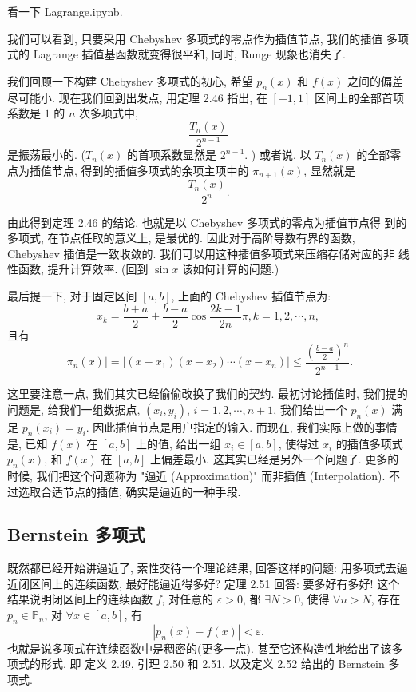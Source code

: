 \documentclass[a4paper]{ctexart}
\begin{document}
看一下 Lagrange.ipynb.

我们可以看到, 只要采用 Chebyshev 多项式的零点作为插值节点, 我们的插值
多项式的 Lagrange 插值基函数就变得很平和, 同时, Runge 现象也消失了.

我们回顾一下构建 Chebyshev 多项式的初心, 希望 $p_n(x)$ 和 $f(x)$ 之间的偏差尽可能小. 
现在我们回到出发点, 用定理 2.46 指出, 在 $[-1, 1]$ 区间上的全部首项系数是 $1$ 的 $n$ 次多项式中,
$$
\frac{T_n(x)}{2^{n - 1}}
$$
是振荡最小的. ($T_n(x)$ 的首项系数显然是 $2^{n - 1}$. )
或者说, 以 $T_n(x)$ 的全部零点为插值节点, 得到的插值多项式的余项主项中的
$\pi_{n + 1}(x)$, 显然就是
$$
\frac{T_n(x)}{2^n}.
$$

由此得到定理 2.46 的结论, 也就是以 Chebyshev 多项式的零点为插值节点得
到的多项式, 在节点任取的意义上, 是最优的. 因此对于高阶导数有界的函数,
Chebyshev 插值是一致收敛的. 我们可以用这种插值多项式来压缩存储对应的非
线性函数, 提升计算效率. (回到 $\sin x$ 该如何计算的问题.)

最后提一下, 对于固定区间 $[a, b]$, 上面的 Chebyshev 插值节点为:
$$
x_k = \frac{b + a}{2} + \frac{b - a}{2} \cos\frac{2k - 1}{2n} \pi, k = 1, 2, \cdots, n,
$$
且有
$$
|\pi_{n}(x)| = |(x - x_1) (x - x_2) \cdots (x - x_n)| \leq
\frac{\left(\frac{b - a}{2}\right)^n}{2^{n - 1}}.
$$

这里要注意一点, 我们其实已经偷偷改换了我们的契约. 最初讨论插值时, 
我们提的问题是, 给我们一组数据点, $(x_i, y_i)$, $i = 1, 2, \cdots, n + 1$, 
我们给出一个 $p_n(x)$ 满足 $p_n(x_i) = y_i$. 因此插值节点是用户指定的输入. 
而现在, 我们实际上做的事情是, 已知 $f(x)$ 在 $[a, b]$ 上的值, 
给出一组 $x_i \in [a, b]$, 使得过 $x_i$ 的插值多项式 $p_n(x)$, 
和 $f(x)$ 在 $[a, b]$ 上偏差最小. 这其实已经是另外一个问题了. 
更多的时候, 我们把这个问题称为 "逼近 (Approximation)" 而非插值 (Interpolation).
不过选取合适节点的插值, 确实是逼近的一种手段. 

\subsection{Bernstein 多项式}

既然都已经开始讲逼近了, 索性交待一个理论结果, 回答这样的问题: 
用多项式去逼近闭区间上的连续函数, 最好能逼近得多好? 定理 2.51 回答: 要多好有多好! 
这个结果说明闭区间上的连续函数 $f$, 对任意的 $\varepsilon > 0$, 
都 $\exists N > 0$, 使得 $\forall n > N$, 存在 $p_n \in \mathbb{P}_n$, 
对 $\forall x \in [a, b]$, 有
$$
|p_n(x) - f(x)| < \varepsilon.
$$
也就是说多项式在连续函数中是稠密的(更多一点). 甚至它还构造性地给出了该多项式的形式, 即
定义 2.49, 引理 2.50 和 2.51, 以及定义 2.52 给出的 Bernstein 多项式. 
\end{document}
